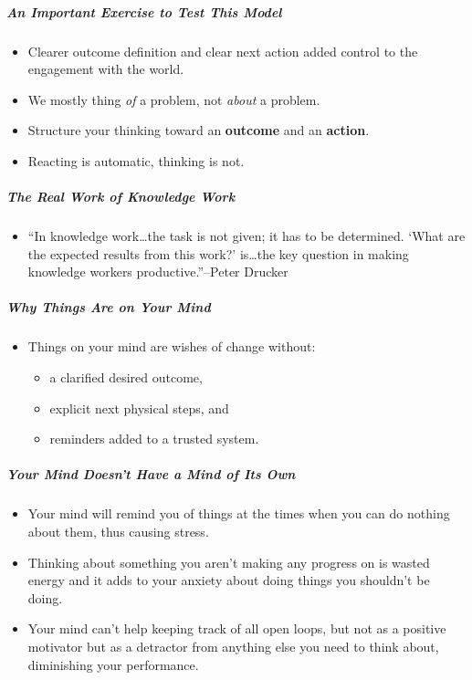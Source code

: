 \documentclass{article}
\begin{document}
\subparagraph{An Important Exercise to Test This Model}

\begin{itemize}
  \item Clearer outcome definition and clear next action added control to the engagement with the world.
  \item We mostly thing \emph{of} a problem, not \emph{about} a problem.
  \item Structure your thinking toward an \textbf{outcome} and an \textbf{action}.
  \item Reacting is automatic, thinking is not.
\end{itemize}

\subparagraph{The Real Work of Knowledge Work}

\begin{itemize}
  \item ``In knowledge work\ldots the task is not given; it has to be determined. `What are the expected results from this work?' is\ldots the key question in making knowledge workers productive.''--Peter Drucker
\end{itemize}

\subparagraph{Why Things Are on Your Mind}

\begin{itemize}
  \item Things on your mind are wishes of change without:
  \begin{itemize}
    \item a clarified desired outcome,
    \item explicit next physical steps, and
    \item reminders added to a trusted system.
  \end{itemize}
\end{itemize}

\subparagraph{Your Mind Doesn't Have a Mind of Its Own}

\begin{itemize}
  \item Your mind will remind you of things at the times when you can do nothing about them, thus causing stress.
  \item Thinking about something you aren't making any progress on is wasted energy and it adds to your anxiety about doing things you shouldn't be doing.
  \item Your mind can't help keeping track of all open loops, but not as a positive motivator but as a detractor from anything else you need to think about, diminishing your performance.
\end{itemize}
\end{document}

